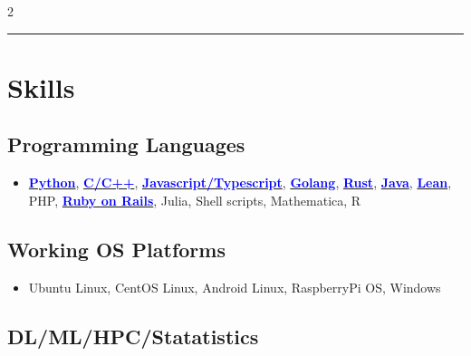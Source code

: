 \documentclass[11pt]{article}
\begin{document}
\begin{multicols*}{2}
\hrule

\section*{Skills}
\subsection*{Programming Languages}
\begin{itemize}[noitemsep]
    \item \href{https://github.com/Kuo-TingKai/submarine-cable-monitor}{\textbf{\textcolor{blue}{Python}}}, 
    \href{https://github.com/Kuo-TingKai/cpp_linux_chat}{\textbf{\textcolor{blue}{C/C++}}}, 
    \href{https://github.com/Kuo-TingKai/three-3d-game}{\textbf{\textcolor{blue}{Javascript/Typescript}}}, 
    \href{https://github.com/Kuo-TingKai/golang-web3-app}{\textbf{\textcolor{blue}{Golang}}},
    \href{https://github.com/xiph/rav1e/compare/master...Kuo-TingKai:rav1e:master}{\textbf{\textcolor{blue}{Rust}}},
    \href{https://github.com/Kuo-TingKai/java-backend-cloud-maven-app}{\textbf{\textcolor{blue}{Java}}}, 
    \href{https://github.com/Kuo-TingKai/lean4-basic-ag}{\textbf{\textcolor{blue}{Lean}}}, PHP, 
    \href{https://github.com/Kuo-TingKai/RoR-app}{\textbf{\textcolor{blue}{Ruby on Rails}}}, 
    Julia, Shell scripts, Mathematica, R
\end{itemize}

\subsection*{Working OS Platforms}
\begin{itemize}[noitemsep]
    \item Ubuntu Linux, CentOS Linux, Android Linux, RaspberryPi OS, Windows
\end{itemize}

\subsection*{DL/ML/HPC/Statatistics}


\end{multicols*}
\end{document}
